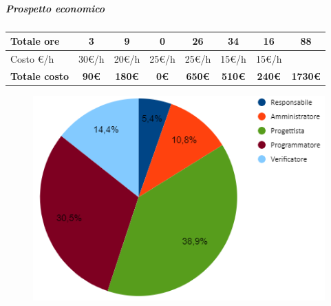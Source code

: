 \subparagraph{Prospetto economico}
\begin{center}
	\renewcommand{\arraystretch}{1.8} %
	\begin{tabular}{ |m{10em}|c|c|c|c|c|c|c| }
	\hline
    Totale ore & 3 & 9 & 0 & 26 & 34 & 16 & \textbf{88}\\
    \hline
    Costo \euro/h & 30\euro/h & 20\euro/h & 25\euro/h & 25\euro/h & 15\euro/h & 15\euro/h & \\
    \hline
    \textbf{Totale costo} & \textbf{90\euro} & \textbf{180\euro} &  \textbf{0\euro} &  \textbf{650\euro} &  \textbf{510\euro} &  \textbf{240\euro} &  \textbf{1730\euro}\\
    \hline
	\end{tabular}

    \begin{figure}[H]
       \centering\includegraphics{images/preventivo/PB-incremento3-costo.png}
    \end{figure}
\end{center}



